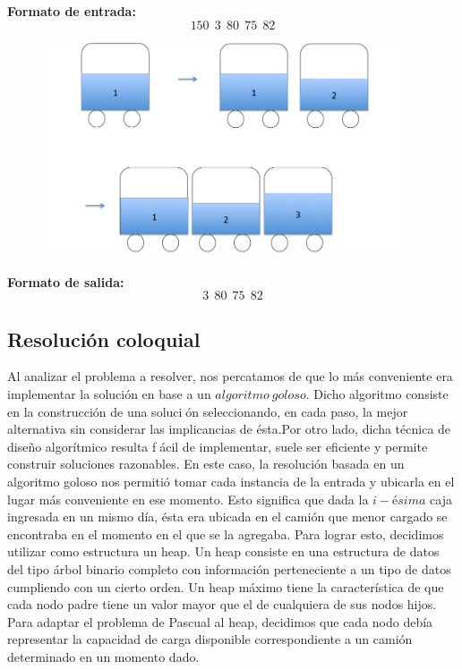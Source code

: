 \begin{itemize}
\textbf{Formato de entrada:} 
$$150\ \ 3\ \ 80\ \ 75\ \ 82$$

\begin{figure}[H] %
\begin{center}
\includegraphics[width=300pt]{../imgs/ejemplo2.jpg}
\end{center}
\end{figure}

\textbf{Formato de salida:}
$$3\ \ 80\ \ 75\ \ 82$$



\end{itemize}
\subsection{Resolución coloquial}
Al analizar el problema a resolver, nos percatamos de que lo más conveniente era implementar la solución en base a un $algoritmo\ goloso$. Dicho algoritmo consiste en la construcción de una solución seleccionando, en cada paso, la mejor alternativa sin considerar las implicancias de ésta.\newline Por otro lado, dicha técnica de diseño algorítmico resulta fácil de implementar, suele ser eficiente y permite construir soluciones razonables.\newline
En este caso, la resolución basada en un algoritmo goloso nos permitió tomar cada instancia de la entrada y ubicarla en el lugar más conveniente en ese momento. Esto significa que dada la $i-ésima$ caja ingresada en un mismo día, ésta era ubicada en el camión que menor cargado se encontraba en el momento en el que se la agregaba. Para lograr esto, decidimos utilizar como estructura un heap.\newline
Un heap consiste en una estructura de datos del tipo árbol binario completo con información perteneciente a un tipo de datos cumpliendo con un cierto orden. Un heap máximo tiene la característica de que cada nodo padre tiene un valor mayor que el de cualquiera de sus nodos hijos.\newline
Para adaptar el problema de Pascual al heap, decidimos que cada nodo debía representar la capacidad de carga disponible correspondiente a un camión determinado en un momento dado.



